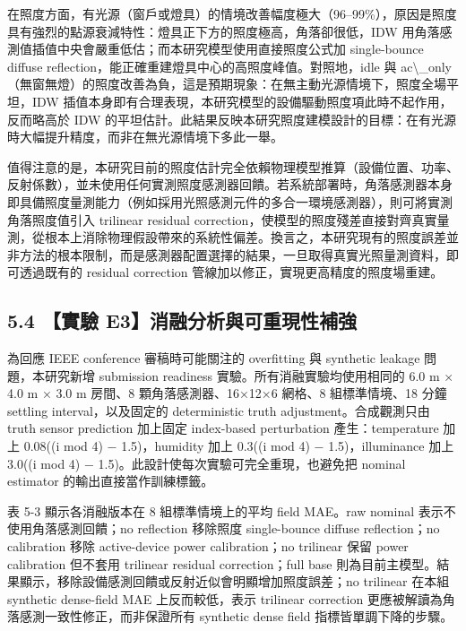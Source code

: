 \documentclass[12pt,a4paper]{article}
\begin{document}
在照度方面，有光源（窗戶或燈具）的情境改善幅度極大（96–99\%），原因是照度具有強烈的點源衰減特性：燈具正下方的照度極高，角落卻很低，IDW 用角落感測值插值中央會嚴重低估；而本研究模型使用直接照度公式加 single-bounce diffuse reflection，能正確重建燈具中心的高照度峰值。對照地，idle 與 ac\textbackslash{}\_\allowbreak{}only（無窗無燈）的照度改善為負，這是預期現象：在無主動光源情境下，照度全場平坦，IDW 插值本身即有合理表現，本研究模型的設備驅動照度項此時不起作用，反而略高於 IDW 的平坦估計。此結果反映本研究照度建模設計的目標：在有光源時大幅提升精度，而非在無光源情境下多此一舉。


值得注意的是，本研究目前的照度估計完全依賴物理模型推算（設備位置、功率、反射係數），並未使用任何實測照度感測器回饋。若系統部署時，角落感測器本身即具備照度量測能力（例如採用光照感測元件的多合一環境感測器），則可將實測角落照度值引入 trilinear residual correction，使模型的照度殘差直接對齊真實量測，從根本上消除物理假設帶來的系統性偏差。換言之，本研究現有的照度誤差並非方法的根本限制，而是感測器配置選擇的結果，一旦取得真實光照量測資料，即可透過既有的 residual correction 管線加以修正，實現更高精度的照度場重建。


\subsection*{5.4 【實驗 E3】消融分析與可重現性補強}

為回應 IEEE conference 審稿時可能關注的 overfitting 與 synthetic leakage 問題，本研究新增 submission readiness 實驗。所有消融實驗均使用相同的 6.0 m × 4.0 m × 3.0 m 房間、8 顆角落感測器、16×12×6 網格、8 組標準情境、18 分鐘 settling interval，以及固定的 deterministic truth adjustment。合成觀測只由 truth sensor prediction 加上固定 index-based perturbation 產生：temperature 加上 0.08((i mod 4) − 1.5)，humidity 加上 0.3((i mod 4) − 1.5)，illuminance 加上 3.0((i mod 4) − 1.5)。此設計使每次實驗可完全重現，也避免把 nominal estimator 的輸出直接當作訓練標籤。


表 5-3 顯示各消融版本在 8 組標準情境上的平均 field MAE。raw nominal 表示不使用角落感測回饋；no reflection 移除照度 single-bounce diffuse reflection；no calibration 移除 active-device power calibration；no trilinear 保留 power calibration 但不套用 trilinear residual correction；full base 則為目前主模型。結果顯示，移除設備感測回饋或反射近似會明顯增加照度誤差；no trilinear 在本組 synthetic dense-field MAE 上反而較低，表示 trilinear correction 更應被解讀為角落感測一致性修正，而非保證所有 synthetic dense field 指標皆單調下降的步驟。
\end{document}

